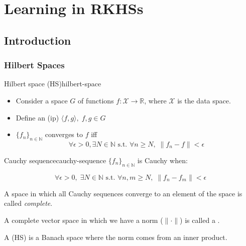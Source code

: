 \chapter[RKHSs]{Learning in RKHSs}

\section{Introduction}

\subsection{Hilbert Spaces}

\begin{definition}[parbox=false]{Hilbert space (HS)}{hilbert-space}
	\begin{itemize}
		\item Consider a space $G$ of functions $f: \mathcal{X} \to \mathbb{R}$,
		      where $\mathcal{X}$ is the data space.

		\item Define an  (ip) $\langle f, g \rangle, \; f, g \in G$ %
		\item $\{f_n\}_{n \in \mathds{N}}$ converges to $f$ iff
		      $$\forall \epsilon > 0, \exists N \in \mathds{N} \text{ s.t. } \forall n \geq N, \; \lVert f_n - f \rVert < \epsilon$$
	\end{itemize}
	\begin{definition}{Cauchy sequence}{cauchy-sequence}
		$\{f_n\}_{n \in \mathds{N}}$ is Cauchy when:

		$$\forall \epsilon > 0, \; \exists N \in \mathds{N} \text{ s.t. } \forall n, m \geq N, \; \lVert f_n - f_m \rVert < \epsilon$$
	\end{definition}

	A space in which all Cauchy sequences converge to an element of the space is
	called \emph{complete}.

	A complete vector space in which we have
	a norm ($\lVert \cdot \rVert$) is called a .

	\begin{marker}
		A  (HS) is a Banach space where the norm
		comes from an inner product.
	\end{marker}

\end{definition}

